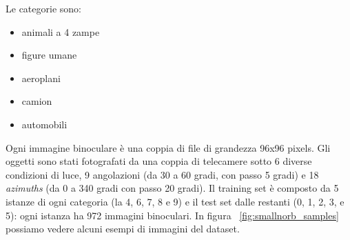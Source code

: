 \documentclass[italian,12pt,a4paper,oneside,final]{report}
\begin{document}
\noindent Le categorie sono:
\begin{itemize}
	\item animali a 4 zampe
	\item figure umane
	\item aeroplani
	\item camion
	\item automobili
\end{itemize}
Ogni immagine binoculare è una coppia di file di grandezza 96x96 pixels.
Gli oggetti sono stati fotografati da una coppia di telecamere sotto 6 diverse condizioni di luce, 9 angolazioni (da 30 a 60 gradi, con passo 5 gradi) e 18 \textit{azimuths} (da 0 a 340 gradi con passo 20 gradi).
Il training set è composto da 5 istanze di ogni categoria (la 4, 6, 7, 8 e 9) e il test set dalle restanti (0, 1, 2, 3, e 5): ogni istanza ha 972 immagini binoculari.
In figura ~\ref{fig:smallnorb_samples} possiamo vedere alcuni esempi di immagini del dataset.
\end{document}
